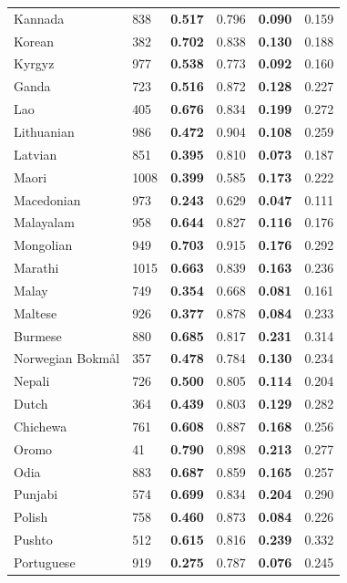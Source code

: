 \begin{longtable}{lp{0.8cm}cccc}
Kannada & 838 & \textbf{0.517} & 0.796 & \textbf{0.090} & 0.159 \\
Korean & 382 & \textbf{0.702} & 0.838 & \textbf{0.130} & 0.188 \\
Kyrgyz & 977 & \textbf{0.538} & 0.773 & \textbf{0.092} & 0.160 \\
Ganda & 723 & \textbf{0.516} & 0.872 & \textbf{0.128} & 0.227 \\
Lao & 405 & \textbf{0.676} & 0.834 & \textbf{0.199} & 0.272 \\
Lithuanian & 986 & \textbf{0.472} & 0.904 & \textbf{0.108} & 0.259 \\
Latvian & 851 & \textbf{0.395} & 0.810 & \textbf{0.073} & 0.187 \\
Maori & 1008 & \textbf{0.399} & 0.585 & \textbf{0.173} & 0.222 \\
Macedonian & 973 & \textbf{0.243} & 0.629 & \textbf{0.047} & 0.111 \\
Malayalam & 958 & \textbf{0.644} & 0.827 & \textbf{0.116} & 0.176 \\
Mongolian & 949 & \textbf{0.703} & 0.915 & \textbf{0.176} & 0.292 \\
Marathi & 1015 & \textbf{0.663} & 0.839 & \textbf{0.163} & 0.236 \\
Malay & 749 & \textbf{0.354} & 0.668 & \textbf{0.081} & 0.161 \\
Maltese & 926 & \textbf{0.377} & 0.878 & \textbf{0.084} & 0.233 \\
Burmese & 880 & \textbf{0.685} & 0.817 & \textbf{0.231} & 0.314 \\
Norwegian Bokmål & 357 & \textbf{0.478} & 0.784 & \textbf{0.130} & 0.234 \\
Nepali & 726 & \textbf{0.500} & 0.805 & \textbf{0.114} & 0.204 \\
Dutch & 364 & \textbf{0.439} & 0.803 & \textbf{0.129} & 0.282 \\
Chichewa & 761 & \textbf{0.608} & 0.887 & \textbf{0.168} & 0.256 \\
Oromo & 41 & \textbf{0.790} & 0.898 & \textbf{0.213} & 0.277 \\
Odia & 883 & \textbf{0.687} & 0.859 & \textbf{0.165} & 0.257 \\
Punjabi & 574 & \textbf{0.699} & 0.834 & \textbf{0.204} & 0.290 \\
Polish & 758 & \textbf{0.460} & 0.873 & \textbf{0.084} & 0.226 \\
Pushto & 512 & \textbf{0.615} & 0.816 & \textbf{0.239} & 0.332 \\
Portuguese & 919 & \textbf{0.275} & 0.787 & \textbf{0.076} & 0.245 \\

\end{longtable}
